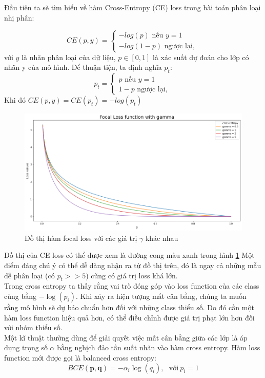 \documentclass[a4paper, 12pt]{report}
\begin{document}
Đầu tiên ta sẽ tìm hiểu về hàm Cross-Entropy (CE) loss trong bài toán phân loại nhị phân:

\begin{equation}
CE(p,y) = 
\begin{cases} 
-log(p) \textrm{     nếu      }  y =1 \\
-log(1-p) \textrm{     ngược lại,      }
\end{cases}
\end{equation}
với $y$ là nhãn phân loại của dữ liệu,  $p \in [0, 1]$ là xác suất dự đoán cho lớp có nhãn y của mô hình. Để thuận tiện, ta định nghĩa $p_t$:
\begin{equation}
p_t = 
\begin{cases} 
p \textrm{    nếu      }  y =1 \\
1-p \textrm{     ngược lại,      }
\end{cases}
\end{equation}
Khi đó $CE(p,y)=CE(p_t)=-log(p_t)$ \\
\begin{figure}[!h]
	\centering
	\includegraphics[width=1\linewidth]{Images/FocalLoss_6_1}
	\caption{Đồ thị hàm focal loss với các giá trị $\gamma$ khác nhau}
	\label{fig:focal-loss_gamma}
\end{figure} 

Đồ thị của CE loss có thể được xem là đường cong màu xanh trong hình \ref{fig:focal-loss_gamma} Một điểm đáng chú ý có thể dễ dàng nhận ra từ đồ thị trên, đó là ngay cả những mẫu dễ phân loại  (có $p_{t} >> 5$) cũng có giá trị loss khá lớn.\\
Trong cross entropy ta thấy rằng vai trò đóng góp vào loss function của các class cùng bằng $-\log(p_i)$. Khi xảy ra hiện tượng mất cân bằng, chúng ta muốn rằng mô hình sẽ dự báo chuẩn hơn đối với những class thiểu số. Do đó cần một hàm loss function hiệu quả hơn, có thể điều chỉnh được giá trị phạt lớn hơn đối với nhóm thiểu số. \\
Một kĩ thuật thường dùng để giải quyết việc mất cân bằng giữa các lớp là áp dụng trọng số $\alpha$ bằng nghịch đảo tần suất nhãn vào hàm cross entropy. Hàm loss function mới được gọi là balanced cross entropy:
\begin{equation}
BCE(\mathbf{p}, \mathbf{q}) = -\alpha_i\log(q_i),~~~ \text{với} ~ p_i=1
\end{equation}
\end{document}
